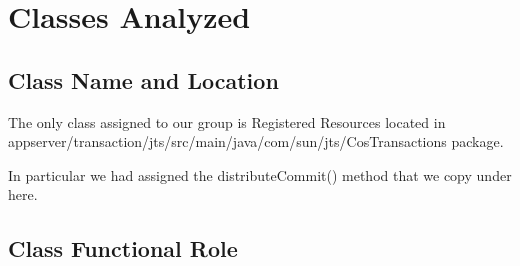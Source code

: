 \section{Classes Analyzed}
\subsection{Class Name and Location}
	The only class assigned to our group is \ttfamily Registered Resources \normalfont located in \ttfamily appserver/transaction/jts/src/main/java/com/sun/jts/CosTransactions \normalfont package.
	
	In particular we had assigned the \ttfamily distributeCommit() \normalfont method that we copy under here.
	
	
	
\subsection{Class Functional Role}